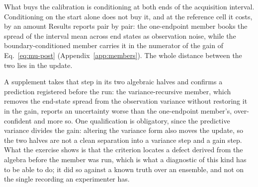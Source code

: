 What buys the calibration is conditioning at both ends of the acquisition interval. Conditioning on the start alone does not buy it, and at the reference cell it costs, by an amount Results reports pair by pair: the one-endpoint member books the spread of the interval mean across end states as observation noise, while the boundary-conditioned member carries it in the numerator of the gain of Eq.~\ref{eq:mu-post} (Appendix~\ref{app:members}). The whole distance between the two lies in the update.

A supplement takes that step in its two algebraic halves and confirms a prediction registered before the run: the variance-recursive member, which removes the end-state spread from the observation variance without restoring it in the gain, reports an uncertainty worse than the one-endpoint member's, over-confident and more so. %
One qualification is obligatory, since the predictive variance divides the gain: altering the variance form also moves the update, so the two halves are not a clean separation into a variance step and a gain step. What the exercise shows is that the criterion locates a defect derived from the algebra before the member was run, which is what a diagnostic of this kind has to be able to do; it did so against a known truth over an ensemble, and not on the single recording an experimenter has.

